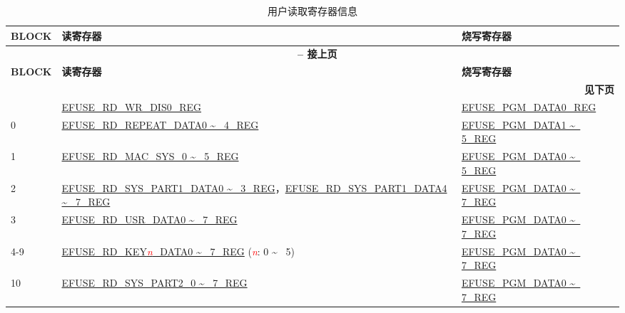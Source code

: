 \begin{longtable}[c]{|l|l|l|}
\caption{用户读取寄存器信息}
\label{tab:efuse-softw-read-para}
    \\\hline
    \rowcolor{lightgray}
        \textbf{BLOCK} & \textbf{读寄存器} & \textbf{烧写寄存器}\\
    \endfirsthead
    
    \multicolumn{3}{c}{\bfseries \tablename\ \thetable{} -- 接上页}\\\hline
    
    \rowcolor{lightgray}
        \textbf{BLOCK} & \textbf{读寄存器} & \textbf{烧写寄存器}\\
    \endhead
    
    \multicolumn{3}{r}{\textbf{见下页}} \\
    \endfoot
    \endlastfoot
    \hline
0 & \hyperref[regdesc:EFUSERDWRDIS0REG]{EFUSE\_RD\_WR\_DIS0\_REG} & \hyperref[regdesc:EFUSEPGMDATANREG]{EFUSE\_PGM\_DATA0\_REG} \\\hline
0 & \hyperref[regdesc:EFUSERDREPEATDATA0REG]{EFUSE\_RD\_REPEAT\_DATA0 \textasciitilde~ 4\_REG} & \hyperref[regdesc:EFUSEPGMDATANREG]{EFUSE\_PGM\_DATA1 \textasciitilde~ 5\_REG} \\\hline
1 & \hyperref[regdesc:EFUSERDMACSYS0REG]{EFUSE\_RD\_MAC\_SYS\_0 \textasciitilde~ 5\_REG} & \hyperref[regdesc:EFUSEPGMDATANREG]{EFUSE\_PGM\_DATA0 \textasciitilde~ 5\_REG} \\\hline
2 & \hyperref[regdesc:EFUSERDSYSPART1DATA0REG]{EFUSE\_RD\_SYS\_PART1\_DATA0 \textasciitilde~ 3\_REG}，\hyperref[regdesc:EFUSERDSYSPART1DATA4TO7REG]{EFUSE\_RD\_SYS\_PART1\_DATA4 \textasciitilde~ 7\_REG} & \hyperref[regdesc:EFUSEPGMDATANREG]{EFUSE\_PGM\_DATA0 \textasciitilde~ 7\_REG} \\\hline
3 & \hyperref[regdesc:EFUSERDUSRDATANREG]{EFUSE\_RD\_USR\_DATA0 \textasciitilde~ 7\_REG} & \hyperref[regdesc:EFUSEPGMDATANREG]{EFUSE\_PGM\_DATA0 \textasciitilde~ 7\_REG} \\ \hline
4-9 & \hyperref[regdesc:EFUSERDKEY0DATANREG]{EFUSE\_RD\_KEY\textcolor{red}{\it{n}}\_DATA0 \textasciitilde~ 7\_REG} (\textcolor{red}{\it{n}}: 0 \textasciitilde~ 5) & \hyperref[regdesc:EFUSEPGMDATANREG]{EFUSE\_PGM\_DATA0 \textasciitilde~ 7\_REG} \\\hline
10 & \hyperref[regdesc:EFUSERDSYSPART2DATANREG]{EFUSE\_RD\_SYS\_PART2\_0 \textasciitilde~ 7\_REG} & \hyperref[regdesc:EFUSEPGMDATANREG]{EFUSE\_PGM\_DATA0 \textasciitilde~ 7\_REG} \\\hline
\end{longtable}
